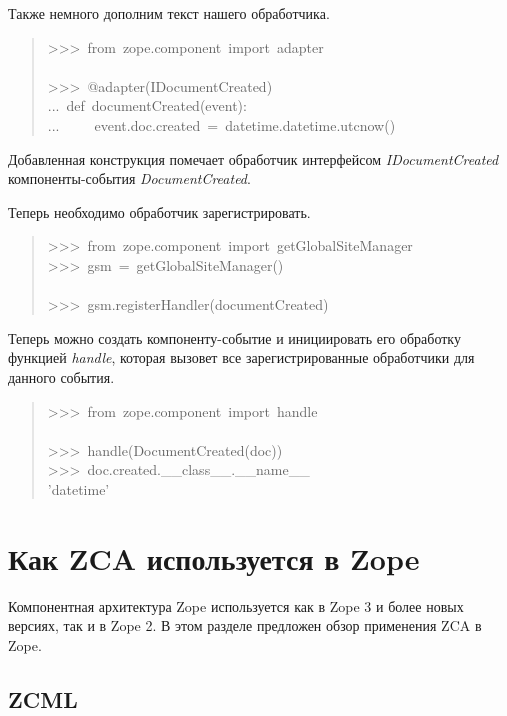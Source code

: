 \documentclass[a4paper,openany,twoside,final]{book}
\providecommand*{\DUroletitlereference}[1]{\textsl{#1}}
\begin{document}
Также немного дополним текст нашего обработчика.

\begin{quote}{\ttfamily \raggedright \noindent
>{}>{}>~from~zope.component~import~adapter\\
~\\
>{}>{}>~@adapter(IDocumentCreated)\\
...~def~documentCreated(event):\\
...~~~~~event.doc.created~=~datetime.datetime.utcnow()
}
\end{quote}

Добавленная конструкция помечает обработчик интерфейсом
\DUroletitlereference{IDocumentCreated} компоненты-события \DUroletitlereference{DocumentCreated}.

Теперь необходимо обработчик зарегистрировать.

\begin{quote}{\ttfamily \raggedright \noindent
>{}>{}>~from~zope.component~import~getGlobalSiteManager\\
>{}>{}>~gsm~=~getGlobalSiteManager()\\
~\\
>{}>{}>~gsm.registerHandler(documentCreated)
}
\end{quote}

Теперь можно создать компоненту-событие и инициировать его обработку
функцией \DUroletitlereference{handle}, которая вызовет все зарегистрированные обработчики
для данного события.

\begin{quote}{\ttfamily \raggedright \noindent
>{}>{}>~from~zope.component~import~handle\\
~\\
>{}>{}>~handle(DocumentCreated(doc))\\
>{}>{}>~doc.created.\_\_class\_\_.\_\_name\_\_\\
'datetime'
}
\end{quote}


\chapter{Как ZCA используется в Zope%
  \label{zca-zope}%
}

Компонентная архитектура Zope используется как в Zope 3 и более новых
версиях, так и в Zope 2.  В этом разделе предложен обзор применения
ZCA в Zope.


\section{ZCML%
  \label{zcml}%
}
\end{document}
